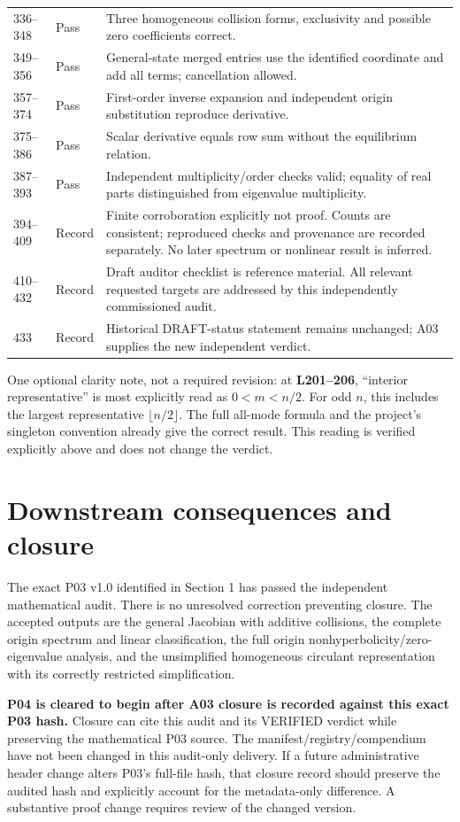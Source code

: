 \documentclass[11pt]{article}
\newcommand{\lin}[1]{\textbf{L#1}}
\begin{document}
\begin{longtable}{@{}L{0.12\textwidth}L{0.12\textwidth}L{0.70\textwidth}@{}}
336--348 & Pass & Three homogeneous collision forms, exclusivity and possible zero coefficients correct.\\
349--356 & Pass & General-state merged entries use the identified coordinate and add all terms; cancellation allowed.\\
357--374 & Pass & First-order inverse expansion and independent origin substitution reproduce derivative.\\
375--386 & Pass & Scalar derivative equals row sum without the equilibrium relation.\\
387--393 & Pass & Independent multiplicity/order checks valid; equality of real parts distinguished from eigenvalue multiplicity.\\
394--409 & Record & Finite corroboration explicitly not proof. Counts are consistent; reproduced checks and provenance are recorded separately. No later spectrum or nonlinear result is inferred.\\
410--432 & Record & Draft auditor checklist is reference material. All relevant requested targets are addressed by this independently commissioned audit.\\
433 & Record & Historical DRAFT-status statement remains unchanged; A03 supplies the new independent verdict.\\
\bottomrule
\end{longtable}
\normalsize

One optional clarity note, not a required revision: at \lin{201--206},
``interior representative'' is most explicitly read as $0<m<n/2$.
For odd $n$, this includes the largest representative $\lfloor n/2\rfloor$.
The full all-mode formula and the project's singleton convention already
give the correct result. This reading is verified explicitly above and does
not change the verdict.

\section{Downstream consequences and closure}
The exact P03 v1.0 identified in Section 1 has passed the independent
mathematical audit. There is no unresolved correction preventing closure.
The accepted outputs are the general Jacobian with additive collisions,
the complete origin spectrum and linear classification, the full origin
nonhyperbolicity/zero-eigenvalue analysis, and the unsimplified homogeneous
circulant representation with its correctly restricted simplification.

\textbf{P04 is cleared to begin after A03 closure is recorded against this
exact P03 hash.} Closure can cite this audit and its VERIFIED verdict while
preserving the mathematical P03 source. The manifest/registry/compendium
have not been changed in this audit-only delivery. If a future administrative
header change alters P03's full-file hash, that closure record should preserve
the audited hash and explicitly account for the metadata-only difference.
A substantive proof change requires review of the changed version.
\end{document}
